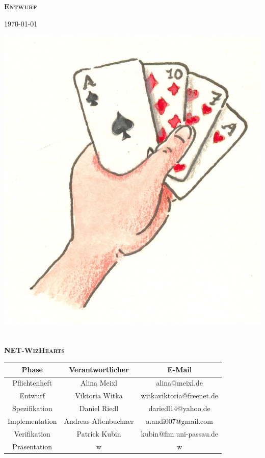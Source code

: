 \documentclass{article}
\begin{document}
\begin{titlepage}

\begin{center}
\textbf{\textsc{\LARGE Entwurf}}

{\large \today}

\vspace{2cm}
\includegraphics{kartenspiel}
\ \\
\ \\

\textbf{\textsc{\LARGE NET-WizHearts}}
\vspace{2cm}

\begin{tabular}{|c|c|c|}\hline
   Phase & Verantwortlicher & E-Mail \\ \hline\hline
   Pflichtenheft & Alina  Meixl  &  alina@meixl.de \\ \hline
   Entwurf & Viktoria Witka & witkaviktoria@freenet.de \\ \hline
   Spezifikation & Daniel Riedl & dariedl14@yahoo.de \\ \hline
   Implementation & Andreas Altenbuchner& a.andi007@gmail.com\\ \hline
   Verifikation &Patrick Kubin & kubin@fim.uni-passau.de\\ \hline
   Präsentation & w& w\\ \hline
 \end{tabular}

\end{center}

\end{titlepage}
\end{document}
